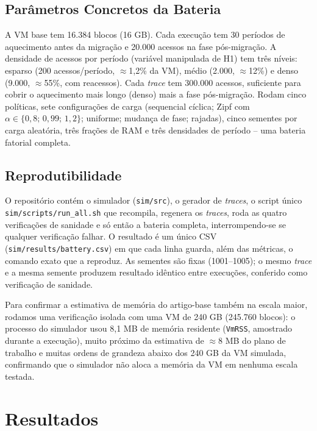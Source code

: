 \documentclass[12pt]{article}
\begin{document}
\subsection{Parâmetros Concretos da Bateria}

A VM base tem 16.384 blocos (16 GB). Cada execução tem 30 períodos de aquecimento antes da migração e 20.000 acessos na fase pós-migração. A densidade de acessos por período (variável manipulada de H1) tem três níveis: esparso (200 acessos/período, $\approx$1,2\% da VM), médio (2.000, $\approx$12\%) e denso (9.000, $\approx$55\%, com reacessos). Cada \textit{trace} tem 300.000 acessos, suficiente para cobrir o aquecimento mais longo (denso) mais a fase pós-migração. Rodam cinco políticas, sete configurações de carga (sequencial cíclica; Zipf com $\alpha\in\{0{,}8;\,0{,}99;\,1{,}2\}$; uniforme; mudança de fase; rajadas), cinco sementes por carga aleatória, três frações de RAM e três densidades de período -- uma bateria fatorial completa.

\subsection{Reprodutibilidade}

O repositório contém o simulador (\texttt{sim/src}), o gerador de \textit{traces}, o script único \texttt{sim/scripts/run\_all.sh} que recompila, regenera os \textit{traces}, roda as quatro verificações de sanidade e só então a bateria completa, interrompendo-se se qualquer verificação falhar. O resultado é um único CSV (\texttt{sim/results/battery.csv}) em que cada linha guarda, além das métricas, o comando exato que a reproduz. As sementes são fixas (1001--1005); o mesmo \textit{trace} e a mesma semente produzem resultado idêntico entre execuções, conferido como verificação de sanidade.

Para confirmar a estimativa de memória do artigo-base também na escala maior, rodamos uma verificação isolada com uma VM de 240 GB (245.760 blocos): o processo do simulador usou 8,1 MB de memória residente (\texttt{VmRSS}, amostrado durante a execução), muito próximo da estimativa de $\approx$8 MB do plano de trabalho e muitas ordens de grandeza abaixo dos 240 GB da VM simulada, confirmando que o simulador não aloca a memória da VM em nenhuma escala testada.

\section{Resultados}
\end{document}
